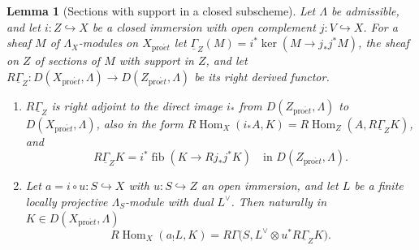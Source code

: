 \documentclass[11pt,a4paper]{article}
\numberwithin{equation}{section}
\newtheorem{lemma}[theorem]{Lemma}
\theoremstyle{definition}
\theoremstyle{remark}
\newcommand{\D}{D}
\newcommand{\RHom}{R\!\operatorname{Hom}}
\newcommand{\proet}{\mathrm{pro}\acute{e}t}
\newcommand{\fib}{\operatorname{fib}}
\begin{document}
\begin{lemma}[Sections with support in a closed subscheme]
\label{b:lem:formal-closed-support}
Let $\Lambda$ be admissible, and let $i:Z\hookrightarrow X$ be a
closed immersion with open complement $j:V\hookrightarrow X$.
For a sheaf $M$ of $\Lambda_X$-modules on $X_{\proet}$ let
$\underline\Gamma_Z(M)=i^*\ker(M\to j_*j^*M)$, the sheaf on $Z$ of
sections of $M$ with support in $Z$, and let
$R\underline\Gamma_Z\colon\D(X_{\proet},\Lambda)\to\D(Z_{\proet},\Lambda)$ be its
right derived functor.
\begin{enumerate}
\item $R\underline\Gamma_Z$ is right adjoint to the direct image
  $i_*$ from $\D(Z_{\proet},\Lambda)$ to $\D(X_{\proet},\Lambda)$, also in
  the form $\RHom_X(i_*A,K)=\RHom_Z(A,R\underline\Gamma_ZK)$, and
  \[
   R\underline\Gamma_Z K=i^*\fib(K\longrightarrow Rj_*j^*K)
   \quad\text{in }\D(Z_{\proet},\Lambda).
  \]
\item Let $a=i\circ u:S\hookrightarrow X$ with $u:S\hookrightarrow Z$ an
  open immersion, and let $L$ be a finite locally projective
  $\Lambda_S$-module with dual $L^\vee$. Then naturally in
  $K\in\D(X_{\proet},\Lambda)$
  \begin{equation}\label{b:eq:stratum-hom}
   \RHom_X(a_!L,K)
   =R\Gamma\bigl(S,L^\vee\otimes u^*R\underline\Gamma_ZK\bigr).
  \end{equation}
\end{enumerate}
\end{lemma}
\end{document}
